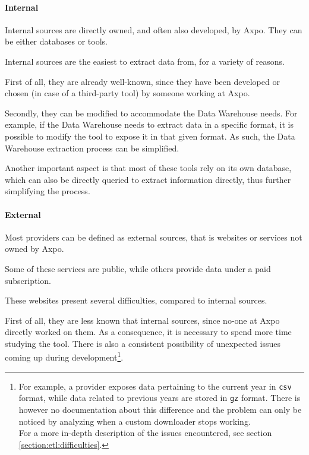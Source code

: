     \paragraph{Internal}
        Internal sources are directly owned, and often also developed, by Axpo.
        They can be either databases or tools.
        
        Internal sources are the easiest to extract data from, for a variety of reasons.
        
        First of all, they are already well-known, since they have been developed or chosen (in case of a third-party tool) by someone working at Axpo.
        
        Secondly, they can be modified to accommodate the Data Warehouse needs.
        For example, if the Data Warehouse needs to extract data in a specific format, it is possible to modify the tool to expose it in that given format.
        As such, the Data Warehouse extraction process can be simplified.
        
        Another important aspect is that most of these tools rely on its own database, which can also be directly queried to extract information directly, thus further simplifying the process.
    \paragraph{External}
        Most providers can be defined as external sources, that is websites or services not owned by Axpo.
        
        Some of these services are public, while others provide data under a paid subscription.
        
        These websites present several difficulties, compared to internal sources.
        
        First of all, they are less known that internal sources, since no-one at Axpo directly worked on them.
        As a consequence, it is necessary to spend more time studying the tool.
        There is also a consistent possibility of unexpected issues coming up during development\footnote{
            For example, a provider exposes data pertaining to the current year in \texttt{csv} format, while data related to previous years are stored in \texttt{gz} format.
            There is however no documentation about this difference and the problem can only be noticed by analyzing when a custom downloader stops working.\\
            For a more in-depth description of the issues encountered, see section \ref{section:etl:difficulties}.
        }.
        
